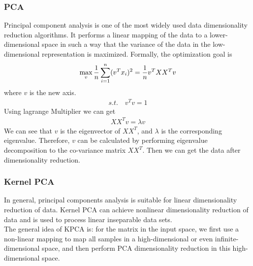 \documentclass{article}
\begin{document}
\subsubsection{PCA}
\indent Principal component analysis is one of the most widely used data dimensionality reduction algorithms. It performs a linear mapping of the data to a lower-dimensional space in such a way that the variance of the data in the low-dimensional representation is maximized.\cite{pearson1901liii}
Formally, the optimization goal is
\begin{eqnarray}
\centering
\max_v \frac{1}{n}\sum_{i=1}^{n}(v^Tx_i)^2=\frac{1}{n}v^TXX^Tv
\end{eqnarray}
where $v$ is the new axis.
\begin{eqnarray}
s.t.\quad v^Tv=1
\end{eqnarray}
Using lagrange Multiplier we can get
\begin{eqnarray}
XX^Tv=\lambda v
\end{eqnarray}
We can see that $v$ is the eigenvector of $XX^T$, and $\lambda$ is the corresponding eigenvalue. Therefore, $v$ can be calculated by performing eigenvalue decomposition to the co-variance matrix $XX^T$. Then we can get the data after dimensionality reduction.
\subsubsection{Kernel PCA}
\indent In general, principal components analysis is suitable for linear dimensionality reduction of data. Kernel PCA can achieve nonlinear dimensionality reduction of data and is used to process linear inseparable data sets.\\
\indent The general idea of KPCA is: for the matrix in the input space, we first use a non-linear mapping to map all samples in a high-dimensional or even infinite-dimensional space, and then perform PCA dimensionality reduction in this high-dimensional space.
\end{document}
